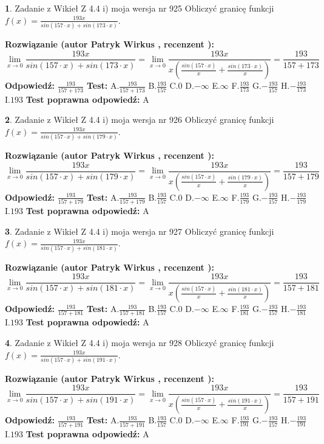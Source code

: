 \documentclass[12pt, a4paper]{article}
\theoremstyle{definition} %
\newtheorem{zad}{}
\newcommand{\zadStart}[1]{\begin{zad}#1\newline}
\newcommand{\zadStop}{\end{zad}}
\newcommand{\rozwStart}[2]{\noindent \textbf{Rozwiązanie (autor #1 , recenzent #2): }\newline}
\newcommand{\rozwStop}{\newline}
\newcommand{\odpStart}{\noindent \textbf{Odpowiedź:}\newline}
\newcommand{\odpStop}{\newline}
\newcommand{\testStart}{\noindent \textbf{Test:}\newline}
\newcommand{\testStop}{\newline}
\newcommand{\kluczStart}{\noindent \textbf{Test poprawna odpowiedź:}\newline}
\newcommand{\kluczStop}{\newline}
\begin{document}
\zadStart{Zadanie z Wikieł Z 4.4 i) moja wersja nr 925}
Obliczyć granicę funkcji $f(x)=\frac{193x}{sin(157\cdot x) +sin(173\cdot x)}$.
\zadStop
\rozwStart{Patryk Wirkus}{}
$$\lim\limits_{x\to 0}\frac{193x}{sin(157\cdot x) +sin(173\cdot x)}=\lim\limits_{x\to 0}\frac{193x}{x(\frac{sin(157\cdot x)}{x}+\frac{sin(173\cdot x)}{x})}=\frac{193}{157+173}$$
\rozwStop
\odpStart
$\frac{193}{157+173}$
\odpStop
\testStart
A.$\frac{193}{157+173}$
B.$\frac{193}{157}$
C.$0$
D.$-\infty$
E.$\infty$
F.$\frac{193}{173}$
G.$-\frac{193}{157}$
H.$-\frac{193}{173}$
I.$193$
\testStop
\kluczStart
A
\kluczStop



\zadStart{Zadanie z Wikieł Z 4.4 i) moja wersja nr 926}
Obliczyć granicę funkcji $f(x)=\frac{193x}{sin(157\cdot x) +sin(179\cdot x)}$.
\zadStop
\rozwStart{Patryk Wirkus}{}
$$\lim\limits_{x\to 0}\frac{193x}{sin(157\cdot x) +sin(179\cdot x)}=\lim\limits_{x\to 0}\frac{193x}{x(\frac{sin(157\cdot x)}{x}+\frac{sin(179\cdot x)}{x})}=\frac{193}{157+179}$$
\rozwStop
\odpStart
$\frac{193}{157+179}$
\odpStop
\testStart
A.$\frac{193}{157+179}$
B.$\frac{193}{157}$
C.$0$
D.$-\infty$
E.$\infty$
F.$\frac{193}{179}$
G.$-\frac{193}{157}$
H.$-\frac{193}{179}$
I.$193$
\testStop
\kluczStart
A
\kluczStop



\zadStart{Zadanie z Wikieł Z 4.4 i) moja wersja nr 927}
Obliczyć granicę funkcji $f(x)=\frac{193x}{sin(157\cdot x) +sin(181\cdot x)}$.
\zadStop
\rozwStart{Patryk Wirkus}{}
$$\lim\limits_{x\to 0}\frac{193x}{sin(157\cdot x) +sin(181\cdot x)}=\lim\limits_{x\to 0}\frac{193x}{x(\frac{sin(157\cdot x)}{x}+\frac{sin(181\cdot x)}{x})}=\frac{193}{157+181}$$
\rozwStop
\odpStart
$\frac{193}{157+181}$
\odpStop
\testStart
A.$\frac{193}{157+181}$
B.$\frac{193}{157}$
C.$0$
D.$-\infty$
E.$\infty$
F.$\frac{193}{181}$
G.$-\frac{193}{157}$
H.$-\frac{193}{181}$
I.$193$
\testStop
\kluczStart
A
\kluczStop



\zadStart{Zadanie z Wikieł Z 4.4 i) moja wersja nr 928}
Obliczyć granicę funkcji $f(x)=\frac{193x}{sin(157\cdot x) +sin(191\cdot x)}$.
\zadStop
\rozwStart{Patryk Wirkus}{}
$$\lim\limits_{x\to 0}\frac{193x}{sin(157\cdot x) +sin(191\cdot x)}=\lim\limits_{x\to 0}\frac{193x}{x(\frac{sin(157\cdot x)}{x}+\frac{sin(191\cdot x)}{x})}=\frac{193}{157+191}$$
\rozwStop
\odpStart
$\frac{193}{157+191}$
\odpStop
\testStart
A.$\frac{193}{157+191}$
B.$\frac{193}{157}$
C.$0$
D.$-\infty$
E.$\infty$
F.$\frac{193}{191}$
G.$-\frac{193}{157}$
H.$-\frac{193}{191}$
I.$193$
\testStop
\kluczStart
A
\kluczStop
\end{document}
